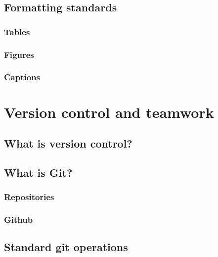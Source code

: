 \documentclass[
]{book}
\begin{document}
\hypertarget{formatting-standards}{%
\chapter{Formatting standards}\label{formatting-standards}}

\hypertarget{tables-1}{%
\section{Tables}\label{tables-1}}

\hypertarget{figures}{%
\section{Figures}\label{figures}}

\hypertarget{captions}{%
\section{Captions}\label{captions}}

\hypertarget{part-version-control-and-teamwork}{%
\part{Version control and teamwork}\label{part-version-control-and-teamwork}}

\hypertarget{what-is-version-control}{%
\chapter{What is version control?}\label{what-is-version-control}}

\hypertarget{what-is-git}{%
\chapter{What is Git?}\label{what-is-git}}

\hypertarget{repositories}{%
\section{Repositories}\label{repositories}}

\hypertarget{github}{%
\section{Github}\label{github}}

\hypertarget{standard-git-operations}{%
\chapter{Standard git operations}\label{standard-git-operations}}
\end{document}
